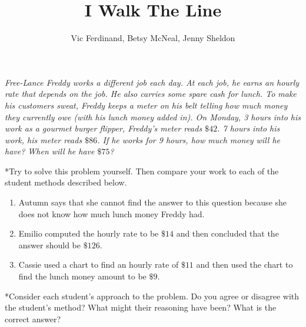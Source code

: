 \documentclass{ximera}
\title{I Walk The Line}
\author{Vic Ferdinand, Betsy McNeal, Jenny Sheldon}
\begin{document}
\begin{abstract}
\end{abstract}
\maketitle



\begin{problem}
 \emph{Free-Lance Freddy works a different job each day.  At each job, he earns an hourly rate that depends on the
job.  He also carries some spare cash for lunch.  To make his
customers sweat, Freddy keeps a meter on his belt telling how much
money they currently owe (with his lunch money added in).  On Monday, 3 hours into his work as a gourmet burger flipper,
  Freddy's meter reads $\$42$. 7 hours into his work, his meter reads
  $\$86$.  If he works for 9 hours, how much money will he have?  When
  will he have $\$75$?}

*Try to solve this problem yourself.  Then compare your work to each of the student methods described below.  

\begin{enumerate}
\item Autumn says that she cannot find the answer to this question because she does not know how much lunch money Freddy had.
\item Emilio computed the hourly rate to be $\$14$ and then concluded that the answer should be $\$126$.
\item Cassie used a chart to find an hourly rate of $\$11$ and then used the chart to find the lunch money amount to be $\$9$.

\end{enumerate}
*Consider each student's approach to the problem.  Do you agree or disagree with the student's method? What might their reasoning have been?  What is the correct answer?
\end{problem}

\newpage
\end{document}
